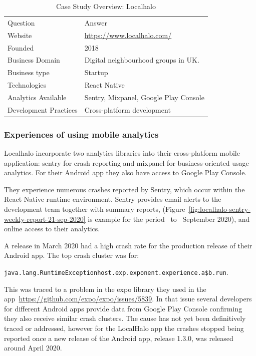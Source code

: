 \begin{table}[htbp!]
    \centering
    \small
    \begin{tabular}{ll}
       Question &Answer  \\
       Website &\url{https://www.localhalo.com/} \\
       Founded &2018\\
       Business Domain &Digital neighbourhood groups in UK.\\
       Business type &Startup \\
       Technologies  &React Native \\
       Analytics Available &Sentry, Mixpanel, Google Play Console \\
       Development Practices &Cross-platform development
    \end{tabular}
    \caption{Case Study Overview: Localhalo}
    \label{tab:local_halo_anaytics_overview}
\end{table}

\subsubsection{Experiences of using mobile analytics}
Localhalo incorporate two analytics libraries into their cross-platform mobile application: sentry for crash reporting and mixpanel for business-oriented usage analytics. For their Android app they also have access to Google Play Console.

They experience numerous crashes reported by Sentry, which occur within the React Native runtime environment. Sentry provides email alerts to the development team together with summary reports, (Figure~\ref{fig:localhalo-sentry-weekly-report-21-sep-2020} is example for the period~ to~ September 2020), and online access to their analytics.

A release in March 2020 had a high crash rate for the production release of their Android app. The top crash cluster was for:

\texttt{java.lang.RuntimeExceptionhost.exp.exponent.experience.a\$b.run}. 

This was traced to a problem in the expo library they used in the app~\url{https://github.com/expo/expo/issues/5839}. In that issue several developers for different Android apps provide data from Google Play Console confirming they also receive similar crash clusters. The cause has not yet been definitively traced or addressed, however for the LocalHalo app the crashes stopped being reported once a new release of the Android app, release 1.3.0, was released around  April 2020.


